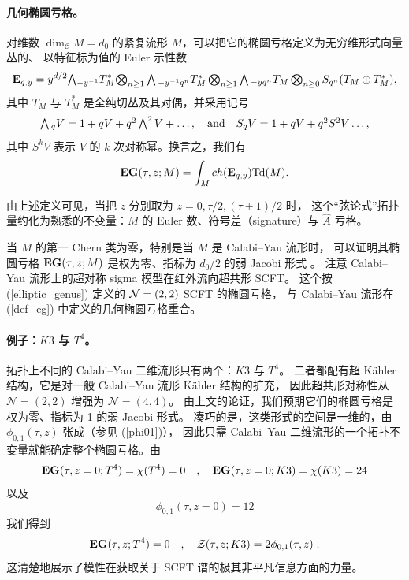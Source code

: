 \documentclass[11pt,a4paper,fontset=windows]{ctexart}
\numberwithin{equation}{section}
\newcommand{\myparagraph}[1]{\paragraph{#1}\mbox\\}
\newcommand{\C}{\mathcal{C}}
\def\t{\tau}
\newcommand{\be}{\begin{equation}}
\newcommand{\ee}{\end{equation}}
\newcommand{\eq}[1]{(\ref{#1})}
\begin{document}

\myparagraph{几何椭圆亏格。}
对维数 $\dim_\C M=d_0$ 的紧复流形 $M$，可以把它的椭圆亏格定义为无穷维形式向量丛的、
以特征标为值的 Euler 示性数
\cite{Ochanine,Witten1987,Landweber_book, WittenInt.J.Mod.Phys.A9:4783-48001994, KawaiNucl.Phys.B414:191-2121994}
$$
{\bf E}_{q,y} 
=
y^{d/2}{\textstyle \bigwedge}{ }_{-y^{-1}} T_M^\ast
\textstyle{\bigotimes}_{n\geq 1} \textstyle\bigwedge{ }_{-y^{-1}q^n} T_M^\ast\bigotimes_{n\geq 1} \textstyle\bigwedge{ }_{-yq^n} 
T_M \bigotimes_{n\geq 0} S_{q^n} (T_M\oplus  T_M^\ast),
$$
其中 $T_M$ 与 \(T_M^\ast\) 是全纯切丛及其对偶，并采用记号
\[ 
\textstyle\bigwedge{ }_q V = 1 + q V + q^2 \textstyle \bigwedge^2 V + \dots,\quad {\rm{and}}\quad S_q V = 1 + q V +q^2 S^2V \dots,
\]
其中 $S^kV$ 表示 $V$ 的 $k$ 次对称幂。换言之，我们有
\be\label{def_eg}
{\bf EG}(\t,z;M) = \int_M ch({\bf E}_{q,y}) {\rm Td}(M).
\ee


由上述定义可见，当把 $z$ 分别取为 $z=0,\t/2,(\t+1)/2$ 时，
这个“弦论式”拓扑量约化为熟悉的不变量：$M$ 的 Euler 数、符号差（signature）与
$\hat{A}$ 亏格。

当 $M$ 的第一 Chern 类为零，特别是当 $M$ 是 Calabi–Yau 流形时，
可以证明其椭圆亏格 ${\bf EG}(\t,z;M)$ 是权为零、指标为 $d_0/2$ 的弱 Jacobi 形式
\cite{KawaiNucl.Phys.B414:191-2121994}。
注意 Calabi–Yau 流形上的超对称 sigma 模型在红外流向超共形 SCFT。
这个按 \eq{elliptic_genus} 定义的 ${\cal N}=(2,2)$ SCFT 的椭圆亏格，
与 Calabi–Yau 流形在 (\ref{def_eg}) 中定义的几何椭圆亏格重合。

\myparagraph{例子：$K3$ 与 $T^4$。}
拓扑上不同的 Calabi–Yau 二维流形只有两个：$K3$ 与 $T^4$。
二者都配有超 Kähler 结构，它是对一般 Calabi–Yau 流形 Kähler 结构的扩充，
因此超共形对称性从 $\mathcal{N}=(2,2)$ 增强为 $\mathcal{N}=(4,4)$。
由上文的论证，我们预期它们的椭圆亏格是权为零、指标为 1 的弱 Jacobi 形式。
凑巧的是，这类形式的空间是一维的，由 $\phi_{0,1}(\t,z)$ 张成（参见 \eq{phi01}），
因此只需 Calabi–Yau 二维流形的一个拓扑不变量就能确定整个椭圆亏格。由
\[{\bf EG}(\t,z=0;T^4) =\chi(T^4) = 0 \quad,\quad {\bf EG}(\t,z=0;K3) =\chi(K3) = 24  
\]
以及
\[\phi_{0,1}(\t,z=0) = 12\]
我们得到
\[
{\bf EG}(\t,z;T^4)=0\quad,\quad {\cal Z}(\t,z;K3) =2  \phi_{0,1}(\t,z)\;.
\]
这清楚地展示了模性在获取关于 SCFT 谱的极其非平凡信息方面的力量。
\end{document}

